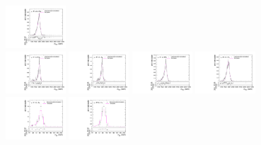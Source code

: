 \begin{figure}[htpb]
  \includegraphics[width=0.2\textwidth]{fig/analysisAppendix/templateVsReco_VBFWprToWZ2000_r0_MVV_mu_LP_nobb_HDy_linear.pdf}\\
  \includegraphics[width=0.2\textwidth]{fig/analysisAppendix/templateVsReco_VBFWprToWZ2000_r0_MVV_mu_HP_vbf_LDy_linear.pdf}
  \includegraphics[width=0.2\textwidth]{fig/analysisAppendix/templateVsReco_VBFWprToWZ2000_r0_MVV_mu_LP_vbf_LDy_linear.pdf}
  \includegraphics[width=0.2\textwidth]{fig/analysisAppendix/templateVsReco_VBFWprToWZ2000_r0_MVV_mu_HP_vbf_HDy_linear.pdf}
  \includegraphics[width=0.2\textwidth]{fig/analysisAppendix/templateVsReco_VBFWprToWZ2000_r0_MVV_mu_LP_vbf_HDy_linear.pdf}\\
  \includegraphics[width=0.2\textwidth]{fig/analysisAppendix/templateVsReco_VBFWprToWZ2000_r0_MJ_mu_HP_bb_LDy.pdf}
  \includegraphics[width=0.2\textwidth]{fig/analysisAppendix/templateVsReco_VBFWprToWZ2000_r0_MJ_mu_LP_bb_LDy.pdf}

\end{figure}
